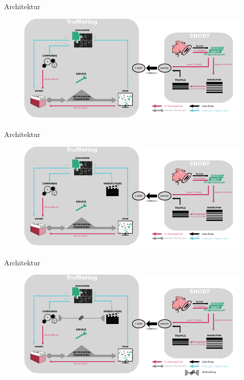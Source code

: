 \documentclass[18pt]{beamer}
\begin{document}
\begin{frame}{Architektur}
    \begin{figure}
    	\centering
    	\includegraphics[width=\textwidth]{./images/15.pdf}
    \end{figure}
\end{frame}

\begin{frame}{Architektur}
    \begin{figure}
    	\centering
    	\includegraphics[width=\textwidth]{./images/16.pdf}
    \end{figure}
\end{frame}

\begin{frame}{Architektur}
    \begin{figure}
    	\centering
    	\includegraphics[width=\textwidth]{./images/17.pdf}
    \end{figure}
\end{frame}
\end{document}
